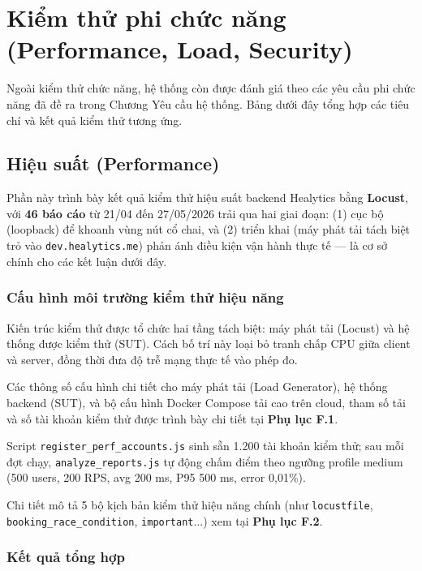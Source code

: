 \section{Kiểm thử phi chức năng (Performance, Load, Security)}

Ngoài kiểm thử chức năng, hệ thống còn được đánh giá theo các yêu cầu phi chức năng đã đề ra trong Chương Yêu cầu hệ thống. Bảng dưới đây tổng hợp các tiêu chí và kết quả kiểm thử tương ứng.

\subsection{Hiệu suất (Performance)}

Phần này trình bày kết quả kiểm thử hiệu suất backend Healytics bằng \textbf{Locust}, với \textbf{46 báo cáo} từ 21/04 đến 27/05/2026 trải qua hai giai đoạn: (1) cục bộ (loopback) để khoanh vùng nút cổ chai, và (2) triển khai (máy phát tải tách biệt trỏ vào \texttt{dev.healytics.me}) phản ánh điều kiện vận hành thực tế --- là cơ sở chính cho các kết luận dưới đây.

\subsubsection{Cấu hình môi trường kiểm thử hiệu năng}

Kiến trúc kiểm thử được tổ chức hai tầng tách biệt: máy phát tải (Locust) và hệ thống được kiểm thử (SUT). Cách bố trí này loại bỏ tranh chấp CPU giữa client và server, đồng thời đưa độ trễ mạng thực tế vào phép đo.


Các thông số cấu hình chi tiết cho máy phát tải (Load Generator), hệ thống backend (SUT), và bộ cấu hình Docker Compose tải cao trên cloud, tham số tải và số tài khoản kiểm thử được trình bày chi tiết tại \textbf{Phụ lục F.1}.



Script \texttt{register\_perf\_accounts.js} sinh sẵn 1.200 tài khoản kiểm thử; sau mỗi đợt chạy, \texttt{analyze\_reports.js} tự động chấm điểm theo ngưỡng profile medium (500 users, 200 RPS, avg 200 ms, P95 500 ms, error 0,01\%).


Chi tiết mô tả 5 bộ kịch bản kiểm thử hiệu năng chính (như \texttt{locustfile}, \texttt{booking\_race\_condition}, \texttt{important}...) xem tại \textbf{Phụ lục F.2}.

\subsubsection{Kết quả tổng hợp}

